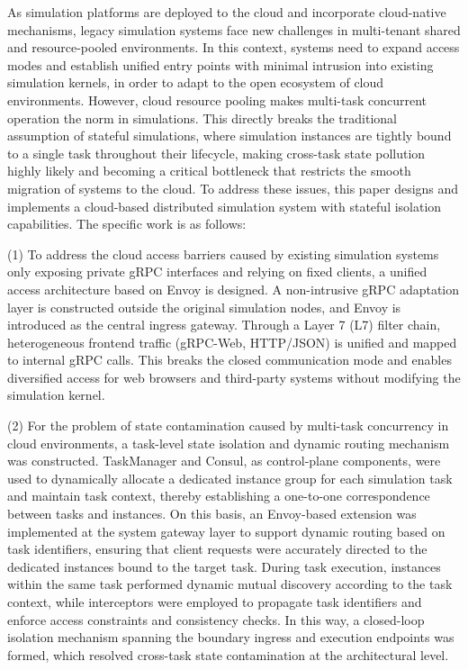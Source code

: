 \documentclass[lang=chs, degree=master, blindreview=true, winfonts=true, academic=false]{yanputhesis}
\begin{document}
\begin{engabstract}                                         %
As simulation platforms are deployed to the cloud and incorporate cloud-native mechanisms, legacy simulation systems face new challenges in multi-tenant shared and resource-pooled environments. In this context, systems need to expand access modes and establish unified entry points with minimal intrusion into existing simulation kernels, in order to adapt to the open ecosystem of cloud environments. However, cloud resource pooling makes multi-task concurrent operation the norm in simulations. This directly breaks the traditional assumption of stateful simulations, where simulation instances are tightly bound to a single task throughout their lifecycle, making cross-task state pollution highly likely and becoming a critical bottleneck that restricts the smooth migration of systems to the cloud. To address these issues, this paper designs and implements a cloud-based distributed simulation system with stateful isolation capabilities.
The specific work is as follows:

(1) To address the cloud access barriers caused by existing simulation systems only exposing private gRPC interfaces and relying on fixed clients, a unified access architecture based on Envoy is designed. A non-intrusive gRPC adaptation layer is constructed outside the original simulation nodes, and Envoy is introduced as the central ingress gateway. Through a Layer 7 (L7) filter chain, heterogeneous frontend traffic (gRPC-Web, HTTP/JSON) is unified and mapped to internal gRPC calls. This breaks the closed communication mode and enables diversified access for web browsers and third-party systems without modifying the simulation kernel.
    
(2) For the problem of state contamination caused by multi-task concurrency in cloud environments, a task-level state isolation and dynamic routing mechanism was constructed. TaskManager and Consul, as control-plane components, were used to dynamically allocate a dedicated instance group for each simulation task and maintain task context, thereby establishing a one-to-one correspondence between tasks and instances. On this basis, an Envoy-based extension was implemented at the system gateway layer to support dynamic routing based on task identifiers, ensuring that client requests were accurately directed to the dedicated instances bound to the target task. During task execution, instances within the same task performed dynamic mutual discovery according to the task context, while interceptors were employed to propagate task identifiers and enforce access constraints and consistency checks. In this way, a closed-loop isolation mechanism spanning the boundary ingress and execution endpoints was formed, which resolved cross-task state contamination at the architectural level.
    

\end{engabstract}
\end{document}
